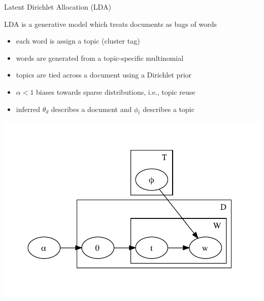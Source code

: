 \documentclass{beamer}
\begin{document}
\begin{frame}[t]{Latent Dirichlet Allocation (LDA)}

LDA is a generative model which treats documents as bags of words
\begin{itemize}
    \item each word is assign a \alert{topic} (cluster tag)
    \item words are generated from a topic-specific multinomial
    \item topics are \alert{tied} across a document using a Dirichlet prior
    \item $\alpha < 1$ biases towards \alert{sparse} distributions, i.e., topic reuse
    \item inferred $\theta_d$ describes a document and $\phi_t$ describes a topic
\end{itemize}

\vspace{-3ex}
\includegraphics[scale=0.55]{lda.pdf}

\end{frame}
\end{document}
